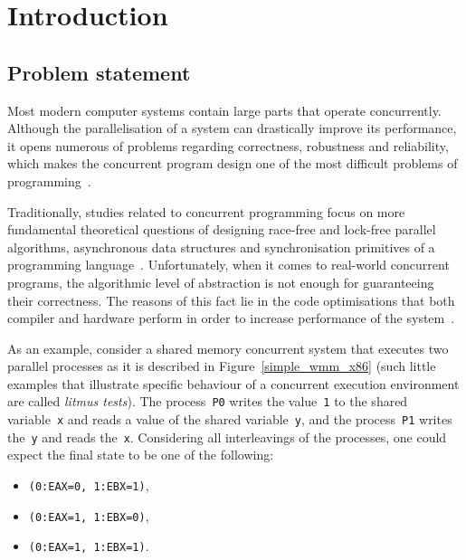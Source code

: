 \chapter{Introduction}
\label{ch:intro}


\section{Problem statement}
\label{ch:intro:problem}

Most modern computer systems contain large parts that operate concurrently.
Although the parallelisation of a system can drastically improve its performance, it opens numerous of problems regarding correctness, robustness and reliability, which makes the concurrent program design one of the most difficult problems of programming~\cite{mckenney2017parallel}.

Traditionally, studies related to concurrent programming focus on more fundamental theoretical questions of designing race-free and lock-free parallel algorithms, asynchronous data structures and synchronisation primitives of a programming language~\cite{ben2006principles}.
Unfortunately, when it comes to real-world concurrent programs, the algorithmic level of abstraction is not enough for guaranteeing their correctness.
The reasons of this fact lie in the code optimisations that both compiler and hardware perform in order to increase performance of the system~\cite{adve1996shared}.

As an example, consider a shared memory concurrent system that executes two parallel processes as it is described in Figure~\ref{simple_wmm_x86} (such little examples that illustrate specific behaviour of a concurrent execution environment are called \textit{litmus tests}).
The process~\texttt{P0} writes the value~\texttt{1} to the shared variable~\texttt{x} and reads a value of the shared variable~\texttt{y}, and the process~\texttt{P1} writes the~\texttt{y} and reads the~\texttt{x}.
Considering all interleavings of the processes, one could expect the final state to be one of the following:
\begin{itemize}[noitemsep,topsep=0pt]
\item \texttt{(0:EAX=0,\,1:EBX=1)},
\item \texttt{(0:EAX=1,\,1:EBX=0)},
\item \texttt{(0:EAX=1,\,1:EBX=1)}.
\end{itemize}

